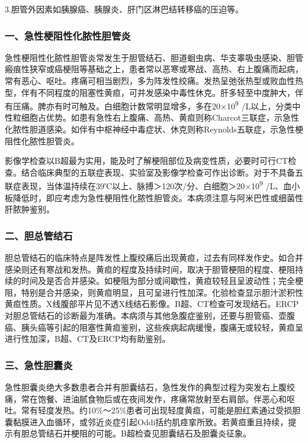 3.胆管外因素如胰腺癌、胰腺炎、肝门区淋巴结转移癌的压迫等。

\subsubsection{一、急性梗阻性化脓性胆管炎}

急性梗阻性化脓性胆管炎常发生于胆管结石、胆道蛔虫病、华支睾吸虫感染、胆管瘢痕性狭窄或癌梗阻等基础之上，患者常以恶寒或寒战、高热、右上腹痛而起病，常有恶心、呕吐。疼痛可相当剧烈，多为阵发性绞痛。发热呈弛张热型或败血性热型，伴有不同程度的阻塞性黄疸，可并发感染中毒性休克。肝多轻至中度肿大，伴有压痛。脾亦有时可触及。白细胞计数常明显增多，多在20×10\textsuperscript{9}
/L以上，分类中性粒细胞占优势。如患有急性右上腹痛、高热、黄疸则称Charcot三联症，示急性化脓性胆道感染。如伴有中枢神经中毒症状、休克则称Reynolds五联症，示急性梗阻性化脓性胆管炎。

影像学检查以B超最为实用，能及时了解梗阻部位及病变性质，必要时可行CT检查。结合临床典型的五联症表现、实验室及影像学检查可作出诊断。对于不具备五联症表现，当体温持续在39℃以上、脉搏＞120次/分、白细胞＞20×10\textsuperscript{9}
/L、血小板降低时，即应考虑为急性梗阻性化脓性胆管炎。本病须注意与阿米巴性或细菌性肝脓肿鉴别。

\subsubsection{二、胆总管结石}

胆总管结石的临床特点是阵发性上腹绞痛后出现黄疸，过去有同样发作史。如合并感染则还有寒战和发热。黄疸的程度及持续时间，取决于胆管梗阻的程度、梗阻持续的时间及是否合并感染。如梗阻为部分或间歇性，黄疸较轻且呈波动性；完全梗阻，特别是合并感染，则黄疸明显，且可呈进行性加深。化验检查显示胆汁淤积性黄疸性质。X线腹部平片见不透X线结石影像。B超、CT检查可发现结石。ERCP对胆总管结石的诊断最为准确。本病须与其他急腹症鉴别，还要与胆管癌、壶腹癌、胰头癌等引起的阻塞性黄疸鉴别，这些疾病起病缓慢，腹痛无或较轻，黄疸呈进行性加深，B超、CT及ERCP均有助鉴别。

\subsubsection{三、急性胆囊炎}

急性胆囊炎绝大多数患者合并有胆囊结石，急性发作的典型过程为突发右上腹绞痛，常在饱餐、进油腻食物后或在夜间发作，疼痛常放射至右肩部。伴恶心和呕吐。常有轻度发热。约10\%～25\%患者可出现轻度黄疸，可能是胆红素通过受损胆囊黏膜进入血循环，或邻近炎症引起Oddi括约肌痉挛所致。若黄疸重且持续，提示有胆总管结石并梗阻的可能。B超检查见胆囊结石及胆囊炎征象。

